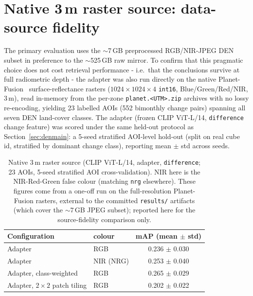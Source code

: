 \documentclass{article}
\begin{document}
\appendix

\section[Native 3 m raster source: data-source fidelity]{Native 3\,m raster source: data-source fidelity}
\label{sec:nativeraster}

The primary evaluation uses the $\sim$7\,GB preprocessed RGB/NIR-JPEG DEN subset
in preference to the $\sim$525\,GB raw mirror. To confirm that this pragmatic
choice does not cost retrieval performance - i.e.\ that the conclusions survive
at full radiometric depth - the adapter was also run directly on the native
Planet-Fusion~\cite{planetfusion} surface-reflectance rasters
($1024\times1024\times4$ \texttt{int16}, Blue/Green/Red/NIR, 3\,m), read in-memory
from the per-zone \texttt{planet.<UTM>.zip} archives with no lossy re-encoding,
yielding 23 labelled AOIs (552 bimonthly change pairs) spanning all seven DEN
land-cover classes. The adapter (frozen CLIP ViT-L/14, \texttt{difference} change
feature) was scored under the same held-out protocol as
Section~\ref{sec:denmain}: a 5-seed stratified AOI-level hold-out (split on real
cube id, stratified by dominant change class), reporting mean $\pm$ std across
seeds.

\begin{table}[H]
    \centering
    \caption{Native 3\,m raster source (CLIP ViT-L/14, adapter, \texttt{difference};
    23 AOIs, 5-seed stratified AOI cross-validation). NIR here is the
    NIR-Red-Green false colour (matching \texttt{nrg} elsewhere). These figures come
    from a one-off run on the full-resolution Planet-Fusion rasters, external to the
    committed \texttt{results/} artifacts (which cover the $\sim$7\,GB JPEG subset);
    reported here for the source-fidelity comparison only.}
    \label{tab:nativeraster}
    \begin{tabular}{llc}
        \toprule
        \textbf{Configuration} & \textbf{colour} & \textbf{mAP (mean $\pm$ std)} \\
        \midrule
        Adapter                & RGB  & 0.236 $\pm$ 0.030 \\
        Adapter                & NIR (NRG)  & 0.253 $\pm$ 0.040 \\
        Adapter, class-weighted & RGB & 0.265 $\pm$ 0.029 \\
        Adapter, $2\times2$ patch tiling & RGB & 0.202 $\pm$ 0.022 \\
        \bottomrule
    \end{tabular}
\end{table}
\end{document}
